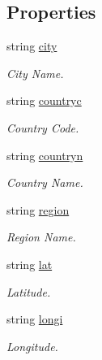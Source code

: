 \subsection*{Properties}
\begin{DoxyCompactItemize}
\item 
string \hyperlink{class_p_http_1_1_geo_location_a9c01aeb86b6ac15c948fd012b39ba890}{city}
\begin{DoxyCompactList}\small\item\em City Name. \end{DoxyCompactList}\item 
string \hyperlink{class_p_http_1_1_geo_location_a38c269ee6aab229f48557ed307062262}{countryc}
\begin{DoxyCompactList}\small\item\em Country Code. \end{DoxyCompactList}\item 
string \hyperlink{class_p_http_1_1_geo_location_abc8cdf15b000b1b66d07441c6af9c479}{countryn}
\begin{DoxyCompactList}\small\item\em Country Name. \end{DoxyCompactList}\item 
string \hyperlink{class_p_http_1_1_geo_location_a137fff36b7b5fc1e6ccde2c4994fe919}{region}
\begin{DoxyCompactList}\small\item\em Region Name. \end{DoxyCompactList}\item 
string \hyperlink{class_p_http_1_1_geo_location_a08c2ec5ba0d715f9361e80506d5acb30}{lat}
\begin{DoxyCompactList}\small\item\em Latitude. \end{DoxyCompactList}\item 
string \hyperlink{class_p_http_1_1_geo_location_a542c785a9c4581de63402a36a13b199d}{longi}
\begin{DoxyCompactList}\small\item\em Longitude. \end{DoxyCompactList}\item 

\end{DoxyCompactItemize}
